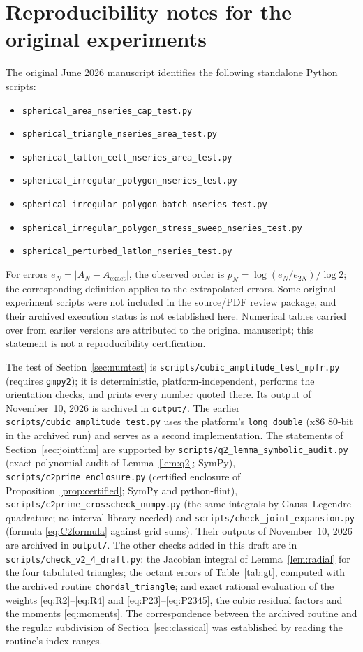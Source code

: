 \documentclass[11pt]{article}
\theoremstyle{remark}
\newcommand{\Aex}{A_{\mathrm{exact}}}
\begin{document}
\section{Reproducibility notes for the original experiments}
The original June 2026 manuscript identifies the following standalone Python scripts:
\begin{itemize}
\item \texttt{spherical\_area\_nseries\_cap\_test.py}
\item \texttt{spherical\_triangle\_nseries\_area\_test.py}
\item \texttt{spherical\_latlon\_cell\_nseries\_area\_test.py}
\item \texttt{spherical\_irregular\_polygon\_nseries\_test.py}
\item \texttt{spherical\_irregular\_polygon\_batch\_nseries\_test.py}
\item \texttt{spherical\_irregular\_polygon\_stress\_sweep\_nseries\_test.py}
\item \texttt{spherical\_perturbed\_latlon\_nseries\_test.py}
\end{itemize}
For errors $e_N=|A_N-\Aex|$, the observed order is $p_N=\log(e_N/e_{2N})/\log2$; the
corresponding definition applies to the extrapolated errors. Some original experiment scripts
were not included in the source/PDF review package, and their archived execution status is not
established here. Numerical tables carried over from earlier versions are attributed to the
original manuscript; this statement is not a reproducibility certification.

\sloppy The test of Section~\ref{sec:numtest} is \texttt{scripts/cubic\_amplitude\_test\_mpfr.py}
(requires \texttt{gmpy2}); it is deterministic, platform-independent, performs the orientation
checks, and prints every number quoted there. Its output of November~10, 2026 is archived in
\texttt{output/}. The earlier \texttt{scripts/cubic\_amplitude\_test.py} uses the platform's
\texttt{long double} (x86 80-bit in the archived run) and serves as a second implementation. The statements of Section~\ref{sec:jointthm} are supported by
\texttt{scripts/q2\_lemma\_symbolic\_audit.py} (exact polynomial audit of
Lemma~\ref{lem:q2}; SymPy), \texttt{scripts/c2prime\_enclosure.py} (certified enclosure of
Proposition~\ref{prop:certified}; SymPy and python-flint),
\texttt{scripts/c2prime\_crosscheck\_numpy.py} (the same integrals by Gauss--Legendre
quadrature; no interval library needed) and \texttt{scripts/check\_joint\_expansion.py}
(formula \eqref{eq:C2formula} against grid sums). Their outputs of November~10, 2026 are
archived in \texttt{output/}. The other checks
added in this draft are in \texttt{scripts/check\_v2\_4\_draft.py}: the Jacobian
integral of Lemma~\ref{lem:radial} for the four tabulated triangles; the octant errors of
Table~\ref{tab:gt}, computed with the archived routine \texttt{chordal\_triangle}; and exact
rational evaluation of the weights \eqref{eq:R2}--\eqref{eq:R4} and
\eqref{eq:P23}--\eqref{eq:P2345}, the cubic residual factors and the moments
\eqref{eq:moments}. The correspondence between the archived routine and the regular
subdivision of Section~\ref{sec:classical} was established by reading the routine's index
ranges.
\end{document}
